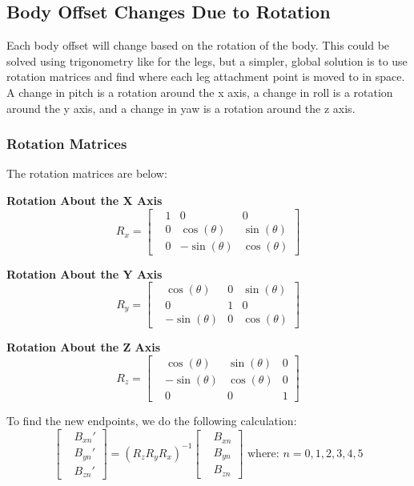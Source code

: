 \documentclass[12pt, letterpaper]{article}
\begin{document}
		\subsection{Body Offset Changes Due to Rotation}
			Each body offset will change based on the rotation of the body. This could be solved using trigonometry like for the legs, but a simpler, global solution is to use rotation matrices and find where each leg attachment point is moved to in space. A change in pitch is a rotation around the x axis, a change in roll is a rotation around the y axis, and a change in yaw is a rotation around the z axis.
			\subsubsection{Rotation Matrices}
				The rotation matrices are below:
				
				\textbf{Rotation About the X Axis}
				\begin{equation*}
				R_x = 
					\begin{bmatrix}
						&1 &0 &0 \\
    					&0 &\cos(\theta) &\sin(\theta) \\
    					&0 &-\sin(\theta) &\cos(\theta)
					\end{bmatrix}
				\end{equation*}
				
				\textbf{Rotation About the Y Axis}
				\begin{equation*}
				R_y = 
					\begin{bmatrix}
						&\cos(\theta) &0 &\sin(\theta) \\
    					&0 &1 &0 \\ 
    					&-\sin(\theta) &0 &\cos(\theta)
					\end{bmatrix}
				\end{equation*}
				
				\textbf{Rotation About the Z Axis}
				\begin{equation*}
				R_z = 
					\begin{bmatrix}
						&\cos(\theta) &\sin(\theta)&0 \\
    					&-\sin(\theta) &\cos(\theta) &0 \\
    					&0 &0 &1
					\end{bmatrix}
				\end{equation*}
				
				To find the new endpoints, we do the following calculation:
				\begin{equation*}
					\begin{bmatrix}
						&B_{xn}' \\
    					&B_{yn}' \\
    					&B_{zn}'
					\end{bmatrix}
					= (R_zR_yR_x)^{-1}
					\begin{bmatrix}
						&B_{xn} \\
    					&B_{yn} \\
    					&B_{zn}
					\end{bmatrix}
					\text{ where: } n = 0,1,2,3,4,5
				\end{equation*}
				
\end{document}

